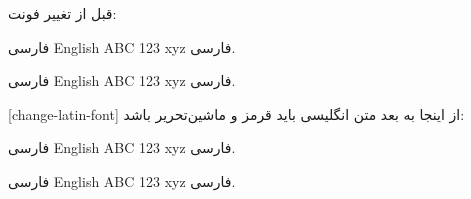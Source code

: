 \documentclass{article}
\begin{document}
    \normalfont
    قبل از تغییر فونت:

    فارسی English ABC 123 xyz فارسی.

    \normalfont
    فارسی English ABC 123 xyz فارسی.

    \normalfont

    \bigskip
    [change-latin-font]{%
    }
    \normalfont
    از اینجا به بعد متن انگلیسی باید قرمز و ماشین‌تحریر باشد:

    فارسی English ABC 123 xyz فارسی.

    \normalfont
    فارسی English ABC 123 xyz فارسی.
\end{document}
